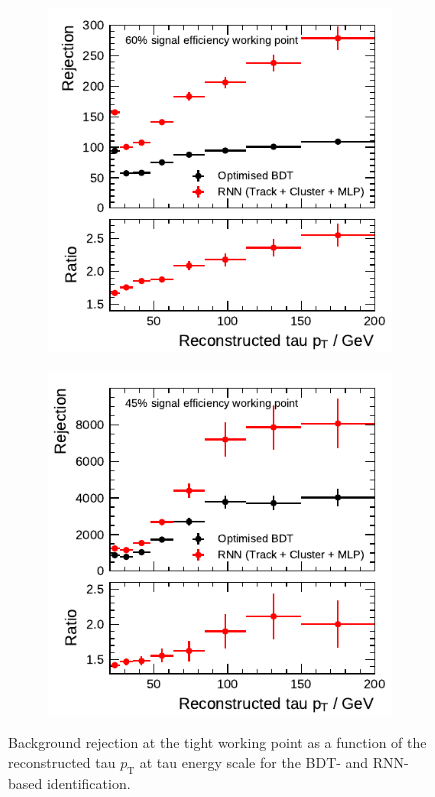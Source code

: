 \begin{figure}[htb]
  \begin{subfigure}[t]{0.48\textwidth}
    \centering
    \includegraphics{./figures/rnn/combined/rnn_tight_1p.pdf}
  \end{subfigure}\hfill
  \begin{subfigure}[t]{0.48\textwidth}
    \centering
    \includegraphics{./figures/rnn/combined/rnn_tight_3p.pdf}
  \end{subfigure}
  \caption{Background rejection at the tight working point as a function of the
    reconstructed tau $p_\text{T}$ at tau energy scale for the BDT- and
    RNN-based identification.}
  \label{fig:combined_working_points}
\end{figure}



